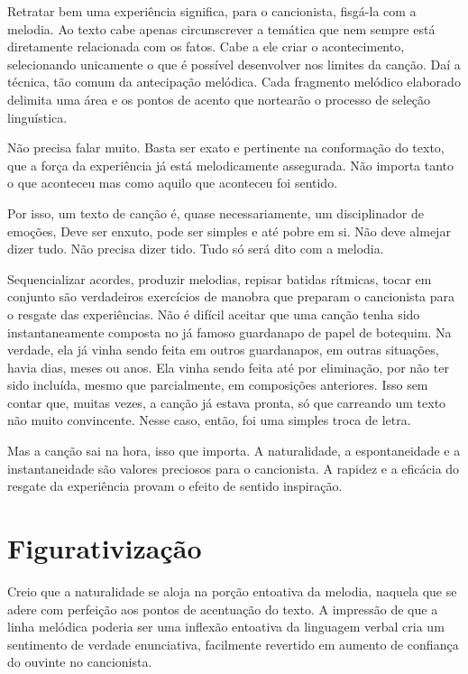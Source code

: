 Retratar bem uma experiência significa, para o cancionista, fisgá-la com
a melodia. Ao texto cabe apenas circunscrever a temática que nem sempre
está diretamente relacionada com os fatos. Cabe a ele criar o
acontecimento, selecionando unicamente o que é possível desenvolver nos
limites da canção. Daí a técnica, tão comum da antecipação melódica.
Cada fragmento melódico elaborado delimita uma área e os pontos de
acento que nortearão o processo de seleção linguística.~

Não precisa falar muito. Basta ser exato e pertinente na conformação do
texto, que a força da experiência já está melodicamente assegurada. Não
importa tanto o que aconteceu mas como aquilo que aconteceu foi sentido.

Por isso, um texto de canção é, quase necessariamente, um disciplinador
de emoções, Deve ser enxuto, pode ser simples e até pobre em si. Não
deve almejar dizer tudo. Não precisa dizer tido. Tudo só será dito com a
melodia.

Sequencializar acordes, produzir melodias, repisar batidas rítmicas,
tocar em conjunto são verdadeiros exercícios de manobra que preparam o
cancionista para o resgate das experiências. Não é difícil aceitar que
uma canção tenha sido instantaneamente composta no já famoso guardanapo
de papel de botequim. Na verdade, ela já vinha sendo feita em outros
guardanapos, em outras situações, havia dias, meses ou anos. Ela vinha
sendo feita até por eliminação, por não ter sido incluída, mesmo que
parcialmente, em composições anteriores. Isso sem contar que, muitas
vezes, a canção já estava pronta, só que carreando um texto não muito
convincente. Nesse caso, então, foi uma simples troca de letra.~

Mas a canção sai na hora, isso que importa. A naturalidade, a
espontaneidade e a instantaneidade são valores preciosos para o
cancionista. A rapidez e a eficácia do resgate da experiência provam o
efeito de sentido inspiração.

\section{Figurativização}

Creio que a naturalidade se aloja na porção entoativa da melodia,
naquela que se adere com perfeição aos pontos de acentuação do texto. A
impressão de que a linha melódica poderia ser uma inflexão entoativa da
linguagem verbal cria um sentimento de verdade enunciativa, facilmente
revertido em aumento de confiança do ouvinte no cancionista.~


